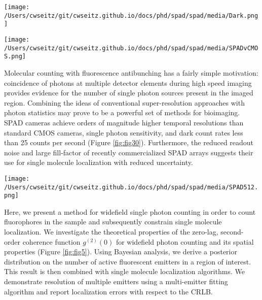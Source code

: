 \begin{figure*}[t]
\centering
\texttt{[image: /Users/cwseitz/git/cwseitz.github.io/docs/phd/spad/spad/media/Dark.png]}
\caption{\textbf{Dark counts of the SPAD array}. (left) Average pixel-wise dark counts for a 100x100 pixel region exposed for 100ms (right) Variance of dark counts for 100ms exposure.}
\label{fig:fig30}
\end{figure*}    


\begin{figure*}[t]
\centering
\texttt{[image: /Users/cwseitz/git/cwseitz.github.io/docs/phd/spad/spad/media/SPADvCMOS.png]}
\caption{\textbf{Comparison of quantum dot images between CMOS and SPAD cameras}. (left) SPAD image of Qdot655 coated on a glass coverslip using a 100X/1.4NA oil-immersion objective (Nikon) and a 10ms exposure time. (right) CMOS image of Qdot655 using a 60X/1.4NA oil-immersion objective (Olympus) and a 10ms exposure time. Both use continuous-wave 640nm excitation}
\label{fig:fig4}
\end{figure*}    

Molecular counting with fluorescence antibunching has a fairly simple motivation: coincidence of photons at multiple detector elements during high speed imaging provides evidence for the number of single photon sources present in the imaged region. Combining the ideas of conventional super-resolution approaches with photon statistics may prove to be a powerful set of methods for bioimaging. SPAD cameras achieve orders of magnitude higher temporal resolutions than standard CMOS cameras, single photon sensitivity, and dark count rates less than 25 counts per second (Figure \ref{fig:fig30}). Furthermore, the reduced readout noise and large fill-factor of recently commercialized SPAD arrays suggests their use for single molecule localization with reduced uncertainty.

\begin{figure*}[t]
\centering
\texttt{[image: /Users/cwseitz/git/cwseitz.github.io/docs/phd/spad/spad/media/SPAD512.png]}
\caption{\textbf{Experimental setup for widefield photon counting}. A 532nm pulsed laser is directed through a spatial filter, galvo mirror, and passed through filtering and focusing optics to a 100X oil-immersion objective. Emission light of a 50$\mu$m grid is projected onto the SPAD512 camera (inset)}
\label{fig:fig5}
\end{figure*}    


Here, we present a method for widefield single photon counting in order to count fluorophores in the sample and subsequently constrain single molecule localization. We investigate the theoretical properties of the zero-lag, second-order coherence function $g^{(2)}(0)$ for widefield photon counting and its spatial properties (Figure \ref{fig:fig5}). Using Bayesian analysis, we derive a posterior distribution on the number of active fluorescent emitters in a region of interest. This result is then combined with single molecule localization algorithms.  We demonstrate resolution of multiple emitters using a multi-emitter fitting algorithm and report localization errors with respect to the CRLB.

